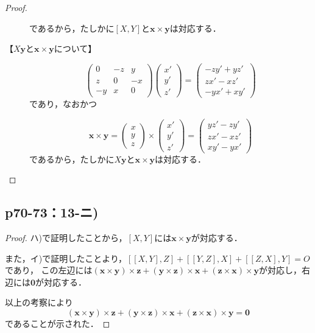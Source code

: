 \documentclass[uplatex,dvipdfmx,a4paper,11pt,fleqn]{jsarticle}
\begin{document}
\begin{leftbar}
\begin{proof}
\begin{description}
\[        \]
        であるから，たしかに$[X,Y]$と$\bm{x} \times \bm{y}$は対応する．
        \item[【$X\bm{y}$と$\bm{x}\times\bm{y}$について】]
        \[
            \begin{pmatrix} 0 & -z & y \\ z & 0 & -x \\ -y & x & 0 \end{pmatrix} \begin{pmatrix} x' \\ y' \\ z' \end{pmatrix} = \begin{pmatrix} -zy'+yz' \\ zx'-xz' \\ -yx'+xy' \end{pmatrix}
        \]
        であり，なおかつ
   
        \[
            \bm{x}\times \bm{y} = \begin{pmatrix} x \\ y \\ z \end{pmatrix} \times \begin{pmatrix} x' \\ y ' \\ z' \end{pmatrix} = \begin{pmatrix} yz'-zy' \\ zx'-xz' \\ xy'-yx' \end{pmatrix}
        \]
        であるから，たしかに$X\bm{y}$と$\bm{x} \times \bm{y}$は対応する．
    \end{description}
    \end{proof}
    \end{leftbar}
    

    \subsection*{p70-73：13-ニ)}

    \begin{tleftbar}
        \begin{proof}
            ハ)で証明したことから，$[X,Y]$には$\bm{x} \times \bm{y}$が対応する．

            また，イ)で証明したことより，$[[X,Y],Z] +[[Y,Z],X]+[[Z,X],Y]=O$であり，
            この左辺には$(\bm{x}\times\bm{y}) \times \bm{z} + (\bm{y}\times\bm{z}) \times \bm{x} + (\bm{z}\times\bm{x}) \times \bm{y}$が対応し，右辺には$\bm{0}$が対応する．

            以上の考察により
            \[
                (\bm{x}\times\bm{y}) \times \bm{z} + (\bm{y}\times\bm{z}) \times \bm{x} + (\bm{z}\times\bm{x}) \times \bm{y} =\bm{0}
            \]
            であることが示された．
        \end{proof}
    \end{tleftbar}
\end{document}
